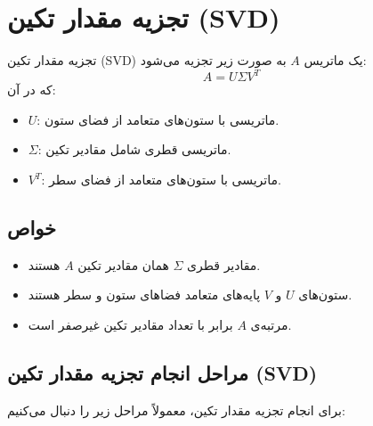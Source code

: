 \section{تجزیه مقدار تکین (SVD)}

\begin{definition}
	
	
	تجزیه مقدار تکین (SVD) یک ماتریس \(A\) به صورت زیر تجزیه می‌شود:
	\[
	A = U \Sigma V^T
	\]
	که در آن:
	\begin{itemize}
		\item \(U\): ماتریسی با ستون‌های متعامد از فضای ستون.
		\item \(\Sigma\): ماتریسی قطری شامل مقادیر تکین.
		\item \(V^T\): ماتریسی با ستون‌های متعامد از فضای سطر.
	\end{itemize}
\end{definition}
\subsection{خواص}
\begin{itemize}
	\item مقادیر قطری \(\Sigma\) همان مقادیر تکین \(A\) هستند.
	\item ستون‌های \(U\) و \(V\) پایه‌های متعامد فضاهای ستون و سطر هستند.
	\item مرتبه‌ی \(A\) برابر با تعداد مقادیر تکین غیرصفر است.
\end{itemize}
\subsection{مراحل انجام تجزیه مقدار تکین (SVD)}
برای انجام تجزیه مقدار تکین، معمولاً مراحل زیر را دنبال می‌کنیم:

